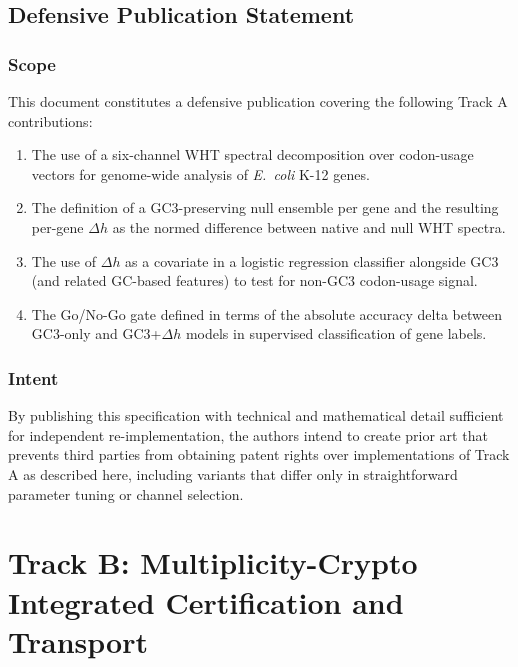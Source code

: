 \documentclass[11pt]{article}
\begin{document}
\subsection{Defensive Publication Statement}

\subsubsection*{Scope}

This document constitutes a defensive publication covering the following Track A contributions:

\begin{enumerate}[leftmargin=1.8em]
  \item The use of a six-channel WHT spectral decomposition over codon-usage vectors for genome-wide analysis of \emph{E.~coli} K-12 genes.
  \item The definition of a GC3-preserving null ensemble per gene and the resulting per-gene \(\Delta h\) as the normed difference between native and null WHT spectra.
  \item The use of \(\Delta h\) as a covariate in a logistic regression classifier alongside GC3 (and related GC-based features) to test for non-GC3 codon-usage signal.
  \item The Go/No-Go gate defined in terms of the absolute accuracy delta between GC3-only and GC3+\(\Delta h\) models in supervised classification of gene labels.
\end{enumerate}

\subsubsection*{Intent}

By publishing this specification with technical and mathematical detail sufficient for independent re-implementation, the authors intend to create prior art that prevents third parties from obtaining patent rights over implementations of Track A as described here, including variants that differ only in straightforward parameter tuning or channel selection.


\section{Track B: Multiplicity-Crypto Integrated Certification and Transport}
\end{document}
